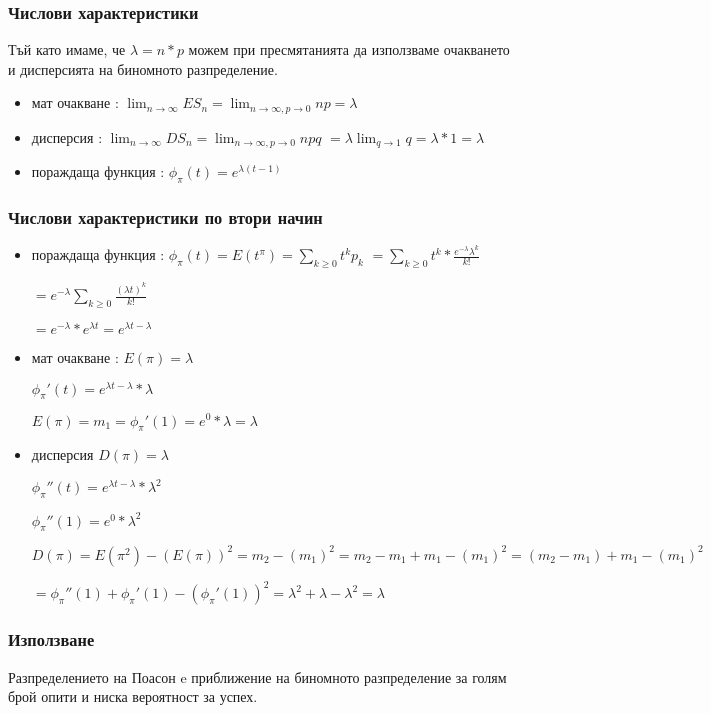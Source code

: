 \documentclass[fleqn,12pt]{article}
\begin{document}
\begin{justify}
\subsubsection{Числови характеристики} 
Тъй като имаме, че $\lambda = n*p$ можем при пресмятанията да използваме очакването и дисперсията на биномното 
разпределение. 
\begin{itemize}
    \item мат очакване : $\lim_{n \rightarrow \infty} ES_n = \lim_{n \rightarrow \infty, p \rightarrow 0} np = \lambda$
    \item дисперсия : $\lim_{n \rightarrow \infty} DS_n = \lim_{n \rightarrow \infty, p \rightarrow 0} npq$
     $ = \lambda \lim_{q \rightarrow 1} q = \lambda * 1 = \lambda$
    \item пораждаща функция : $\phi_\pi(t) = e^{\lambda(t-1)}$
\end{itemize}
\subsubsection{Числови характеристики по втори начин}
\begin{itemize}
    \item пораждаща функция : $\phi_\pi(t) = E(t^\pi) = \sum_{k \geq 0} t^{k}p_k$
    $= \sum_{k \geq 0} t^{k} * \frac{e^{-\lambda}\lambda^k}{k!} $

    $= e^{-\lambda} \sum_{k \geq 0} \frac{(\lambda t)^k}{k!}$

    $= e^{-\lambda} * e^{\lambda t} = e^{\lambda t - \lambda}$
    \item мат очакване : $E(\pi) = \lambda$
    
    $\phi_\pi'(t) = e^{\lambda t - \lambda} * \lambda$ 
    
    $E(\pi) = m_1 = \phi_\pi'(1) = e^0 * \lambda = \lambda$
    
    \item дисперсия $D(\pi) = \lambda$
    
    $\phi_\pi''(t) = e^{\lambda t - \lambda} * \lambda^2$ 
    
    $\phi_\pi''(1) = e^0 * \lambda^2$

    $D(\pi) = E(\pi^2) - (E(\pi))^2 = m_2 - (m_1)^2 = m_2 - m_1 + m_1 - (m_1)^2 = (m_2 - m_1) + m_1 - (m_1)^2$

    $= \phi_\pi''(1) + \phi_\pi'(1) - (\phi_\pi'(1))^2 = \lambda^2 + \lambda - \lambda^2 = \lambda$
\end{itemize}

\subsubsection{Използване} 
Разпределението на Поасон e приближение на биномното разпределение за голям брой опити и ниска вероятност за успех.


\end{justify}
\end{document}
